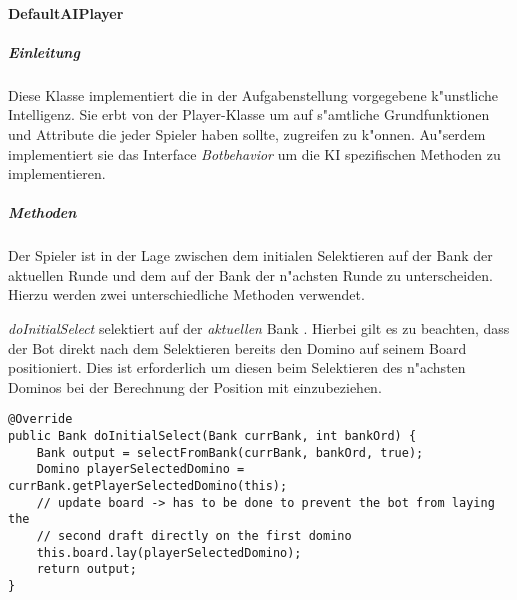 \paragraph{DefaultAIPlayer}
\label{par:defaultAIPlayer}

\subparagraph{Einleitung}
Diese Klasse implementiert die in der Aufgabenstellung vorgegebene k"unstliche Intelligenz. Sie erbt von der Player-Klasse um auf s"amtliche Grundfunktionen und Attribute die jeder Spieler haben sollte, zugreifen zu k"onnen. Au"serdem implementiert sie das Interface \emph{Botbehavior} um die KI spezifischen Methoden zu implementieren. 

\subparagraph{Methoden}
Der Spieler ist in der Lage zwischen dem initialen Selektieren auf der Bank der aktuellen Runde und dem auf der Bank der n"achsten Runde zu unterscheiden. Hierzu werden zwei unterschiedliche Methoden verwendet. 

\emph{doInitialSelect} selektiert auf der \emph{aktuellen} Bank . Hierbei gilt es zu beachten, dass der Bot direkt nach dem Selektieren bereits den Domino auf seinem Board positioniert. Dies ist erforderlich um diesen beim Selektieren des n"achsten Dominos bei der Berechnung der Position mit einzubeziehen. 

\begin{lstlisting}[float,style=CodeHighlighting,caption=DefaultAIPlayer - doInitialSelect,label=lst:defaultAIPlayer_doInitialSelect]
@Override
public Bank doInitialSelect(Bank currBank, int bankOrd) {
    Bank output = selectFromBank(currBank, bankOrd, true);
    Domino playerSelectedDomino = currBank.getPlayerSelectedDomino(this);
    // update board -> has to be done to prevent the bot from laying the
    // second draft directly on the first domino
    this.board.lay(playerSelectedDomino);
    return output;
}
\end{lstlisting}

